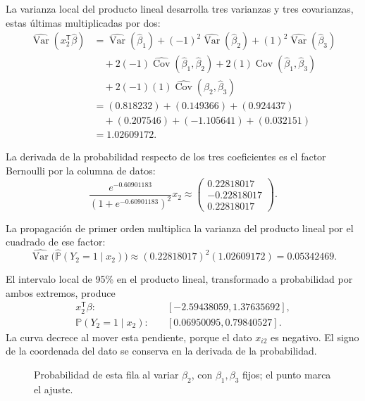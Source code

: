 \documentclass[11pt,a4paper]{article}
\newcommand{\Prob}{\mathbb P}
\newcommand{\T}{^{\mathsf T}}
\DeclareMathOperator{\Var}{Var}
\DeclareMathOperator{\Cov}{Cov}
\begin{document}
La varianza local del producto lineal desarrolla tres varianzas
y tres covarianzas, estas últimas multiplicadas por dos:
\[
\begin{aligned}
\widehat{\Var}(x_{2}\T\widehat\beta)&=\widehat{\Var}(\widehat\beta_1)+(-1)^2\widehat{\Var}(\widehat\beta_2)+(1)^2\widehat{\Var}(\widehat\beta_3)\\&\quad+2(-1)\widehat{\Cov}(\widehat\beta_1,\widehat\beta_2)+2(1)\widehat{\Cov}(\widehat\beta_1,\widehat\beta_3)\\&\quad+2(-1)(1)\widehat{\Cov}(\widehat\beta_2,\widehat\beta_3)\\&=(0.818232)+(0.149366)+(0.924437)\\&\quad+(0.207546)+(-1.105641)+(0.032151)\\&=1.02609172.\end{aligned}
\]

La derivada de la probabilidad respecto de los tres coeficientes
es el factor Bernoulli por la columna de datos:
\[
\frac{e^{-0.60901183}}{(1+e^{-0.60901183})^2}x_{2}\approx\begin{pmatrix}0.22818017\\-0.22818017\\0.22818017\end{pmatrix}.
\]

La propagación de primer orden multiplica la varianza del
producto lineal por el cuadrado de ese factor:
\[
\widehat{\Var}\bigl(\widehat{\Prob}(Y_{2}=1\mid x_{2})\bigr)\approx(0.22818017)^2(1.02609172)=0.05342469.
\]

El intervalo local de 95\% en el producto lineal,
transformado a probabilidad por ambos extremos, produce
\[
\begin{aligned}
x_{2}\T\beta:&\quad[-2.59438059,1.37635692],\\\Prob(Y_{2}=1\mid x_{2}):&\quad[0.06950095,0.79840527].\end{aligned}
\]
La curva decrece al mover esta pendiente, porque el dato $x_{i2}$ es negativo. El signo de la coordenada del dato se conserva en la derivada de la probabilidad.
\begin{figure}[H]\centering
{}
\caption{Probabilidad de esta fila al variar \(\beta_2\), con \(\beta_1,\beta_3\) fijos; el punto marca el ajuste.}
\end{figure}
\end{document}
